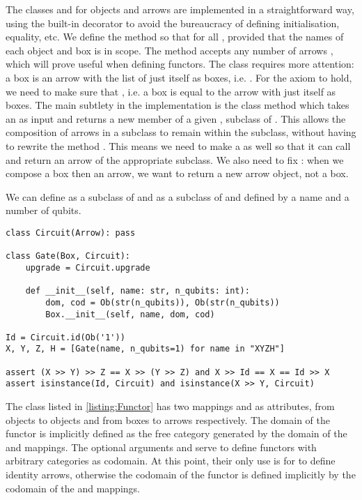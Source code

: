 The classes  and  for objects and arrows are implemented in a straightforward way, using the built-in  decorator to avoid the bureaucracy of defining initialisation, equality, etc.
We define the method  so that  for all , provided that the names of each object and box is in scope.
The method  accepts any number of arrows , which will prove useful when defining functors.
The  class requires more attention: a box  is an arrow with the list of just itself as boxes, i.e. .
For the axiom  to hold, we need to make sure that , i.e. a box is equal to the arrow with just itself as boxes.
The main subtlety in the implementation is the class method  which takes an  as input and returns a new member of a given , subclass of .
This allows the composition of arrows in a subclass to remain within the subclass, without having to rewrite the method .
This means we need to make  a  as well so that it can call  and return an arrow of the appropriate subclass.
We also need to fix : when we compose a box then an arrow, we want to return a new arrow object, not a box.

\begin{example}
We can define  as a subclass of  and  as a subclass of  and  defined by a name and a number of qubits.

\begin{verbatim}
class Circuit(Arrow): pass

class Gate(Box, Circuit):
    upgrade = Circuit.upgrade

    def __init__(self, name: str, n_qubits: int):
        dom, cod = Ob(str(n_qubits)), Ob(str(n_qubits))
        Box.__init__(self, name, dom, cod)

Id = Circuit.id(Ob('1'))
X, Y, Z, H = [Gate(name, n_qubits=1) for name in "XYZH"]

assert (X >> Y) >> Z == X >> (Y >> Z) and X >> Id == X == Id >> X
assert isinstance(Id, Circuit) and isinstance(X >> Y, Circuit)
\end{verbatim}
\end{example}

The  class listed in \ref{listing:Functor} has two mappings  and  as attributes, from objects to objects and from boxes to arrows respectively.
The domain of the functor is implicitly defined as the free category generated by the domain of the  and  mappings.
The optional arguments  and  serve to define functors with arbitrary categories as codomain.
At this point, their only use is for  to define identity arrows, otherwise the codomain of the functor is defined implicitly by the codomain of the  and  mappings.

